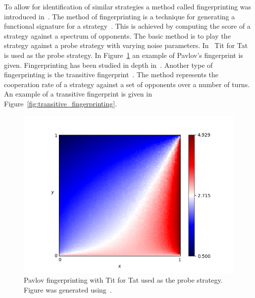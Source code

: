 To allow for identification of similar strategies a method called
fingerprinting was introduced in~\cite{Ashlock2005}. The method of fingerprinting is a
technique for generating a functional signature for a
strategy~\cite{Ashlock2008}. This is achieved by computing the score of a
strategy against a spectrum of opponents. The basic method is to play the
strategy against a probe strategy with varying noise parameters.
In~\cite{Ashlock2005} Tit for Tat is used as the probe strategy. In
Figure~\ref{fig:fingerprinting} an example of Pavlov's fingerprint is given.
Fingerprinting has been studied in depth in~\cite{Ashlock2008, Ashlock2009,
Ashlock2010, Ashlock2006a}. Another type of fingerprinting is the
transitive fingerprint~\cite{axelrodproject}.
The method represents the cooperation rate of a strategy against a set of opponents
over a number of turns. An example of a transitive fingerprint is given in
Figure~\ref{fig:transitive_fingerprinting}.

\begin{figure}[!hbtp]
    \centering
    \includegraphics[height=.3\textheight]{src/chapters/02/Win-Stay_Lose-Shift.png}
    \caption{Pavlov fingerprinting with Tit for Tat used as the probe strategy.
    Figure was generated using~\cite{axelrodproject}.}
    \label{fig:fingerprinting}
\end{figure}

